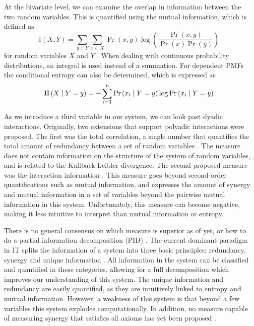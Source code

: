 \documentclass[../main.tex]{subfiles}
\begin{document}
At the bivariate level, we can examine the overlap in information between the two random variables.
This is quantified using the mutual information, which is defined as
%
\begin{equation}
\label{MI}
\mathrm{I} \left( X;Y \right) = \sum_{y \subset Y} \sum_{x \subset X} \Pr \left( x,y \right) \log (\frac{\Pr \left( x,y \right) }{\Pr \left( x \right) \Pr \left( y \right)})
\end{equation}
%
for random variables $X$ and $Y$ \cite{cover2012elements}.
When dealing with continuous probability distributions, an integral is used instead of a summation.
For dependent PMFs the conditional entropy can also be determined, which is expressed as
%
\begin{equation}
\mathrm{H} \left(X \;\middle|\; Y = y \right) = -\sum^n_{i=1} \Pr \left( x_i \;\middle|\; Y = y \right) \log \Pr \left( x_i \;\middle|\; Y = y \right)
\end{equation}
%

As we introduce a third variable in our system, we can look past dyadic interactions.
Originally, two extensions that support polyadic interactions were proposed.
The first was the total correlation, a single number that quantifies the total amount of redundancy between a set of random variables \cite{watanabe1960information}.
The measure does not contain information on the structure of the system of random variables, and is related to the Kullback-Leibler divergence.
The second proposed measure was the interaction information \cite{mcgill1954multivariate}.
This measure goes beyond second-order quantifications such as mutual information, and expresses the amount of synergy and mutual information in a set of variables beyond the pairwise mutual information in this system.
Unfortunately, this measure can become negative, making it less intuitive to interpret than mutual information or entropy.

There is no general consensus on which measure is superior as of yet, or how to do a partial information decomposition (PID) \cite{griffith2011quantifying, williams2010nonnegative}.
The current dominant paradigm in IT splits the information of a system into three basic principles: redundancy, synergy and unique information \cite{williams2010nonnegative}.
All information in the system can be classified and quantified in these categories, allowing for a full decomposition which improves our understanding of this system.
The unique information and redundancy are easily quantified, as they are intuitively linked to entropy and mutual information.
However, a weakness of this system is that beyond a few variables this system explodes computationally.
In addition, no measure capable of measuring synergy that satisfies all axioms has yet been proposed  \cite{griffith2011quantifying}.
\end{document}
